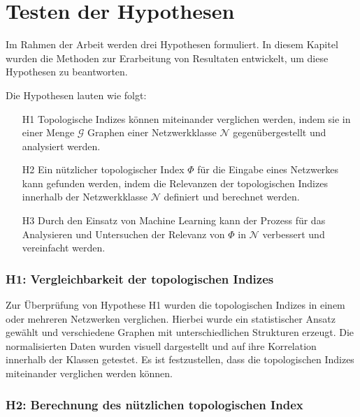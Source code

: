\newpage



\newpage




\section{Testen der Hypothesen}

Im Rahmen der Arbeit werden drei Hypothesen formuliert. 
In diesem Kapitel wurden die Methoden zur Erarbeitung von Resultaten entwickelt, um diese Hypothesen zu beantworten.

Die Hypothesen lauten wie folgt:

\begin{itemize}
    \item [H1] Topologische Indizes können miteinander verglichen werden, indem sie in einer Menge $\mathcal{G}$ Graphen einer Netzwerkklasse $\mathcal{N}$ gegenübergestellt und analysiert werden.
    \item [H2] Ein nützlicher topologischer Index $\Phi$ für die Eingabe eines Netzwerkes kann gefunden werden, indem die Relevanzen der topologischen Indizes innerhalb der Netzwerkklasse $\mathcal{N}$ definiert und berechnet werden.
    \item [H3] Durch den Einsatz von Machine Learning kann der Prozess für das Analysieren und Untersuchen der Relevanz von $\Phi$ in $\mathcal{N}$ verbessert und vereinfacht werden.
\end{itemize}

\subsubsection{H1: Vergleichbarkeit der topologischen Indizes}

Zur Überprüfung von Hypothese H1 wurden die topologischen Indizes in einem oder mehreren Netzwerken verglichen. 
Hierbei wurde ein statistischer Ansatz gewählt und verschiedene Graphen mit unterschiedlichen Strukturen erzeugt. 
Die normalisierten Daten wurden visuell dargestellt und auf ihre Korrelation innerhalb der Klassen getestet. 
Es ist festzustellen, dass die topologischen Indizes miteinander verglichen werden können.

\subsubsection{H2: Berechnung des nützlichen topologischen Index}

